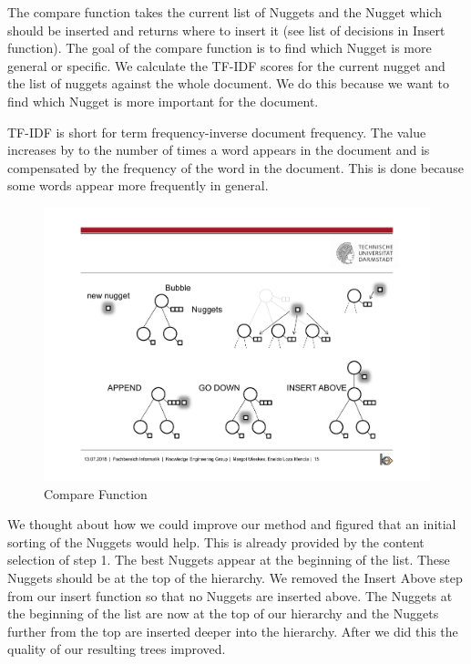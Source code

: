 
The compare function takes the current list of Nuggets and the Nugget which should be inserted and returns where to insert it (see list of decisions in Insert function). The goal of the compare function is to find which Nugget is more general or specific. We calculate the TF-IDF scores for the current nugget and the list of nuggets against the whole document. We do this because we want to find which Nugget is more important for the document.

TF-IDF is short for term frequency-inverse document frequency. The value increases by to the number of times a word appears in the document and is compensated by the frequency of the word in the document. This is done because some words appear more frequently in general. 

\begin{figure}[H]
	\centering
	\includegraphics[trim=22.5cm 12.5cm 2.5cm 5.5cm, clip=true]{img/step2_func.pdf}
	\caption{Compare Function}
	\label{fig:compare}
\end{figure}


We thought about how we could improve our method and figured that an initial sorting of the Nuggets would help. This is already provided by the content selection of step 1. The best Nuggets appear at the beginning of the list. These Nuggets should be at the top of the hierarchy. We removed the Insert Above step from our insert function so that no Nuggets are inserted above. The Nuggets at the beginning of the list are now at the top of our hierarchy and the Nuggets further from the top are inserted deeper into the hierarchy. After we did this the quality of our resulting trees improved.

